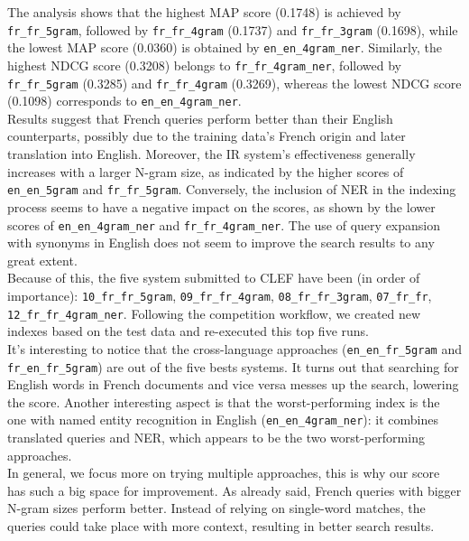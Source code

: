The analysis shows that the highest MAP score (0.1748) is achieved by \texttt{fr\_fr\_5gram}, followed by
\texttt{fr\_fr\_4gram} (0.1737) and \texttt{fr\_fr\_3gram} (0.1698), while the lowest MAP score (0.0360) is obtained by
\texttt{en\_en\_4gram\_ner}.
Similarly, the highest NDCG score (0.3208) belongs to \texttt{fr\_fr\_4gram\_ner}, followed by \texttt{fr\_fr\_5gram}
(0.3285) and \texttt{fr\_fr\_4gram} (0.3269), whereas the lowest NDCG score (0.1098) corresponds to
\texttt{en\_en\_4gram\_ner}.\\

Results suggest that French queries perform better than their English counterparts, possibly due to the training data's
French origin and later translation into English.
Moreover, the IR system's effectiveness generally increases with a larger N-gram size, as indicated by the higher scores
of \texttt{en\_en\_5gram} and \texttt{fr\_fr\_5gram}.
Conversely, the inclusion of NER in the indexing process seems to have a negative impact on the scores, as shown by the
lower scores of \texttt{en\_en\_4gram\_ner} and \texttt{fr\_fr\_4gram\_ner}.
The use of query expansion with synonyms in English does not seem to improve the search results to any great extent.\\

Because of this, the five system submitted to CLEF have been (in order of importance): \texttt{10\_fr\_fr\_5gram},
\texttt{09\_fr\_fr\_4gram}, \texttt{08\_fr\_fr\_3gram}, \texttt{07\_fr\_fr}, \texttt{12\_fr\_fr\_4gram\_ner}.
Following the competition workflow, we created new indexes based on the test data and re-executed this top five runs.\\


It's interesting to notice that the cross-language approaches (\texttt{en\_en\_fr\_5gram} and
\texttt{fr\_en\_fr\_5gram}) are out of the five bests systems.
It turns out that searching for English words in French documents and vice versa messes up the search, lowering the
score.
Another interesting aspect is that the worst-performing index is the one with named entity recognition in English
(\texttt{en\_en\_4gram\_ner}): it combines translated queries and NER, which appears to be the two worst-performing
approaches.\\

In general, we focus more on trying multiple approaches, this is why our score has such a big space for improvement.
As already said, French queries with bigger N-gram sizes perform better.
Instead of relying on single-word matches, the queries could take place with more context, resulting in better search
results.\\
